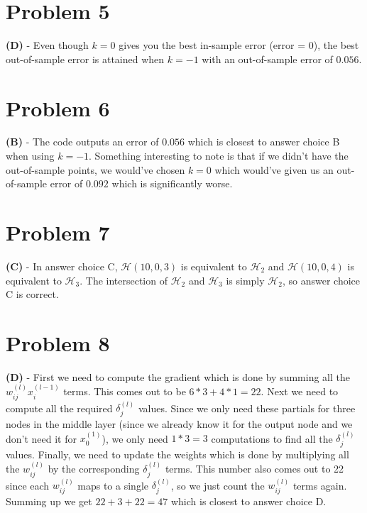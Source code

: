 \documentclass[10pt,letter]{article}
\begin{document}
\section*{Problem 5}

\textbf{(D)} - Even though $k = 0$ gives you the best in-sample error (error = 0), the best out-of-sample error is attained when $k = -1$ with an out-of-sample error of $0.056$.

\section*{Problem 6}

\textbf{(B)} - The code outputs an error of $0.056$ which is closest to answer choice B when using $k=-1$. Something interesting to note is that if we didn't have the out-of-sample points, we would've chosen $k=0$ which would've given us an out-of-sample error of $0.092$ which is significantly worse.

\section*{Problem 7}

\textbf{(C)} - In answer choice C, $\mathcal{H}(10, 0, 3)$ is equivalent to $\mathcal{H}_2$ and $\mathcal{H}(10,0,4)$ is equivalent to $\mathcal{H}_3$. The intersection of $\mathcal{H}_2$ and $\mathcal{H}_3$ is simply $\mathcal{H}_2$, so answer choice C is correct.

\section*{Problem 8}

\textbf{(D)} - First we need to compute the gradient which is done by summing all the $w_{ij}^{(l)}x_i^{(l-1)}$ terms. This comes out to be $6 * 3 + 4* 1 = 22$. Next we need to compute all the required $\delta _j^{(l)}$ values. Since we only need these partials for three nodes in the middle layer (since we already know it for the output node and we don't need it for $x_0^{(1)}$), we only need $1*3 = 3$ computations to find all the $\delta _j^{(l)}$ values. Finally, we need to update the weights which is done by multiplying all the $w_{ij}^{(l)}$ by the corresponding $\delta _j^{(l)}$ terms. This number also comes out to 22 since each $w_{ij}^{(l)}$ maps to a single $\delta _j^{(l)}$, so we just count the $w_{ij}^{(l)}$ terms again. Summing up we get $22 + 3 + 22 = 47$ which is closest to answer choice D.
\end{document}

